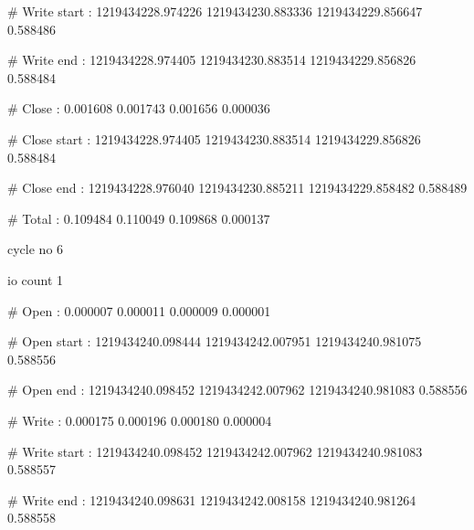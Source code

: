 \vspace{10pt}
{\small \# Write start :          1219434228.974226       1219434230.883336    
   1219434229.856647       0.588486}

\vspace{10pt}
{\small \# Write end   :          1219434228.974405       1219434230.883514    
   1219434229.856826       0.588484}

\vspace{10pt}
{\small \# Close       :          0.001608                0.001743             
   0.001656                0.000036}

\vspace{10pt}
{\small \# Close start :          1219434228.974405       1219434230.883514    
   1219434229.856826       0.588484}

\vspace{10pt}
{\small \# Close end   :          1219434228.976040       1219434230.885211    
   1219434229.858482       0.588489}

\vspace{10pt}
{\small \# Total       :          0.109484                0.110049             
   0.109868                0.000137}

\vspace{10pt}
{\small cycle no         6}

\vspace{10pt}
{\small io count         1}

\vspace{10pt}
{\small \# Open        :          0.000007                0.000011             
   0.000009                0.000001}

\vspace{10pt}
{\small \# Open start  :          1219434240.098444       1219434242.007951    
   1219434240.981075       0.588556}

\vspace{10pt}
{\small \# Open end    :          1219434240.098452       1219434242.007962    
   1219434240.981083       0.588556}

\vspace{10pt}
{\small \# Write       :          0.000175                0.000196             
   0.000180                0.000004}

\vspace{10pt}
{\small \# Write start :          1219434240.098452       1219434242.007962    
   1219434240.981083       0.588557}

\vspace{10pt}
{\small \# Write end   :          1219434240.098631       1219434242.008158    
   1219434240.981264       0.588558}

